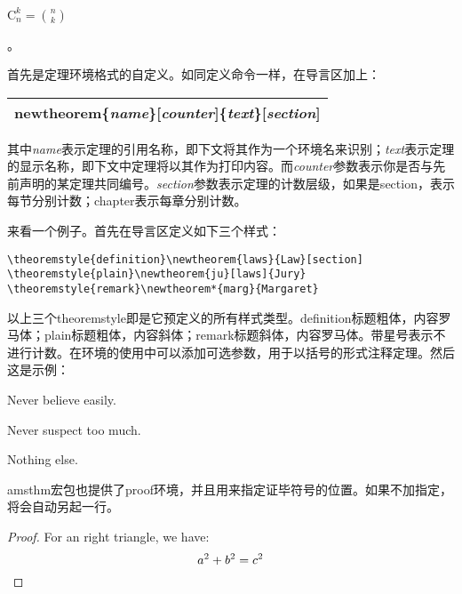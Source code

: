{\begin{codeshow}
  $\mathrm{C}_n^k=\binom{n}{k}$
\end{codeshow}

。

首先是定理环境格式的自定义。如同定义命令一样，在导言区加上：

\noindent\begin{tabular}{|l|}
\hline
\char92{}newtheorem\{\textit{name}\}[\textit{counter}]\{\textit{text}\}[\textit{section}] \\
\hline
\end{tabular}

其中\textit{name}表示定理的引用名称，即下文将其作为一个环境名来识别；\textit{text}表示定理的显示名称，即下文中定理将以其作为打印内容。而\textit{counter}参数表示你是否与先前声明的某定理共同编号。\textit{section}参数表示定理的计数层级，如果是section，表示每节分别计数；chapter表示每章分别计数。

来看一个例子。首先在导言区定义如下三个样式：
\begin{verbatim}
\theoremstyle{definition}\newtheorem{laws}{Law}[section]
\theoremstyle{plain}\newtheorem{ju}[laws]{Jury}
\theoremstyle{remark}\newtheorem*{marg}{Margaret}
\end{verbatim}

以上三个theoremstyle即是它预定义的所有样式类型。definition标题粗体，内容罗马体；plain标题粗体，内容斜体；remark标题斜体，内容罗马体。带星号表示不进行计数。在环境的使用中可以添加可选参数，用于以括号的形式注释定理。然后这是示例：

\begin{codeshow}
\begin{laws}
Never believe easily.
\end{laws}
\begin{ju}[The 2nd]
Never suspect too much.
\end{ju}
\begin{marg}Nothing else.\end{marg}
\end{codeshow}

amsthm宏包也提供了proof环境，并且用\latexline{\\qedhere}来指定证毕符号的位置。如果不加指定，将会自动另起一行。

\begin{codeshow}
\begin{proof}
For an right triangle, we have:
  \[a^2+b^2=c^2 \qedhere\]
\end{proof}
\end{codeshow}

}
